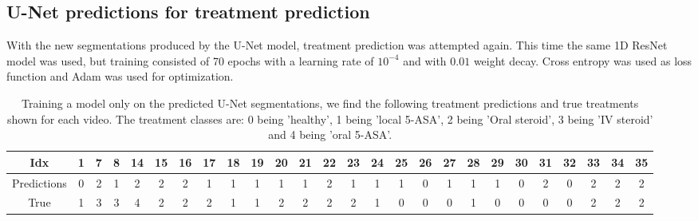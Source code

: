 \subsection{U-Net predictions for treatment prediction}
With the new segmentations produced by the U-Net model, treatment prediction was attempted again. This time the same 1D ResNet model was used, but training consisted of 70 epochs with a learning rate of $10^{-4}$ and with $0.01$ weight decay. Cross entropy was used as loss function and Adam was used for optimization.

\begin{table}[H]
	\hspace{-2.7cm}
	\begin{tabular}{|c|c|c|c|c|c|c|c|c|c|c|c|c|c|c|c|c|c|c|c|c|c|c|c|c|c|}
		\hline
		Idx&1
		&7
		&8
		&14
		&15
		&16
		&17
		&18
		&19
		&20
		&21
		&22
		&23
		&24
		&25
		&26
		&27
		&28
		&29
		&30
		&31
		&32
		&33
		&34
		&35\\\hline\hline
		Predictions&0
		&2
		&1
		&2
		&2
		&2
		&1
		&1
		&1
		&1
		&1
		&2
		&1
		&1
		&1
		&0
		&1
		&1
		&1
		&0
		&2
		&0
		&2
		&2
		&2\\\hline
		True&1
		&3
		&3
		&4
		&2
		&2
		&2
		&1
		&1
		&2
		&2
		&2
		&2
		&1
		&0
		&0
		&0
		&1
		&0
		&0
		&0
		&0
		&2
		&2
		&2\\\hline
	\end{tabular}
	\caption{Training a model only on the predicted U-Net segmentations, we find the following treatment predictions and true treatments shown for each video. The treatment classes are: 0 being 'healthy', 1 being 'local 5-ASA', 2 being 'Oral steroid', 3 being 'IV steroid' and 4 being 'oral 5-ASA'.}
	\label{unetPredsTreatmentTable}
\end{table}

